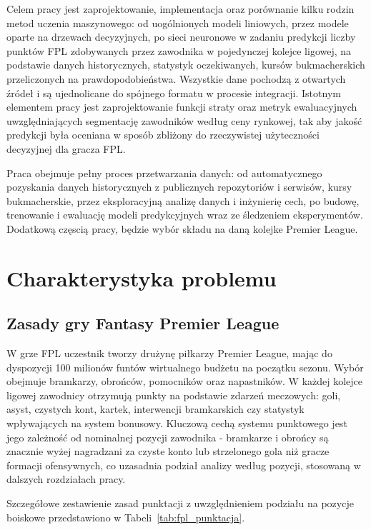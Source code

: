 \documentclass[a4paper,twoside,11pt]{mwrep}
\theoremstyle{plain} \newtheorem{thm}{Twierdzenie}
\theoremstyle{plain} \newtheorem{lem}{Lemat}
\theoremstyle{definition} \newtheorem{defn}{Definicja}
\theoremstyle{remark} \newtheorem*{rem}{Wniosek}
\begin{document}
Celem pracy jest zaprojektowanie, implementacja oraz porównanie kilku
rodzin metod uczenia maszynowego: od uogólnionych modeli liniowych, przez modele oparte na drzewach decyzyjnych, po sieci neuronowe w zadaniu predykcji liczby punktów FPL
zdobywanych przez zawodnika w pojedynczej kolejce ligowej, na podstawie
danych historycznych, statystyk oczekiwanych, kursów
bukmacherskich przeliczonych na prawdopodobieństwa. Wszystkie dane pochodzą z otwartych źródeł i są ujednolicane do spójnego formatu w procesie integracji. Istotnym elementem pracy jest zaprojektowanie funkcji straty
oraz metryk ewaluacyjnych uwzględniających segmentację zawodników według
ceny rynkowej, tak aby jakość predykcji była oceniana w sposób zbliżony do
rzeczywistej użyteczności decyzyjnej dla gracza FPL.

Praca obejmuje pełny proces przetwarzania danych: od automatycznego
pozyskania danych historycznych z publicznych repozytoriów i serwisów, kursy bukmacherskie, przez eksploracyjną
analizę danych i inżynierię cech, po budowę, trenowanie i ewaluację modeli
predykcyjnych wraz ze śledzeniem eksperymentów. Dodatkową częscią pracy, będzie wybór składu na daną kolejke Premier League.


\chapter{Charakterystyka problemu}\label{ch:problem}
\section{Zasady gry Fantasy Premier League}

W grze FPL uczestnik tworzy drużynę piłkarzy Premier League, mając do dyspozycji 100 milionów funtów wirtualnego budżetu na początku sezonu. Wybór obejmuje bramkarzy, obrońców, pomocników oraz napastników. W każdej kolejce ligowej zawodnicy otrzymują punkty na podstawie zdarzeń meczowych: goli, asyst, czystych kont, kartek, interwencji bramkarskich czy statystyk wpływających na system bonusowy. Kluczową cechą systemu punktowego jest jego zależność od nominalnej pozycji zawodnika - bramkarze i obrońcy są znacznie wyżej nagradzani za czyste konto lub strzelonego gola niż gracze formacji ofensywnych, co uzasadnia podział analizy według pozycji, stosowaną w dalszych rozdziałach pracy.

Szczegółowe zestawienie zasad punktacji z uwzględnieniem podziału na pozycje boiskowe przedstawiono w Tabeli~\ref{tab:fpl_punktacja}.
\end{document}
